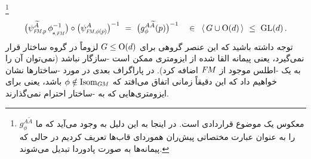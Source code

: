 \footnote{
    معکوس یک موضوع قراردادی است.
    در اینجا به این دلیل به وجود می‌آید که ما $g_\phi^{A\widetilde{A}}$ را به عنوان عبارت مختصاتی پیش‌ران هموردای قاب‌ها تعریف کردیم در حالی که پیمانه‌ها به صورت پادوردا تبدیل می‌شوند.
}
\begin{align}\label{eq:gauge_trafo_pushforward_gauge}
    \big( \psiFMp^{\widetilde{A}} \, \dphiFM^{-1} \big) \circ \big( \psiFMphip^A \big)^{-1}
    \ =\ \big( g_\phi^{A\widetilde{A}}(p) \big)^{-1}
    \ \ \ \in\,\ \langle\, G\cup\O{d} \,\rangle\ \leq\ \GL{d} \,.
\end{align}
توجه داشته باشید که این عنصر گروهی برای $G\leq\operatorname{O}(d)$ لزوماً در گروه ساختار قرار نمی‌گیرد، یعنی پیمانه القا شده از ایزومتری ممکن است -سازگار نباشد (نمی‌توان آن را به یک -اطلس موجود از $F\mkern-1.5muM$ اضافه کرد).
در پاراگراف بعدی در مورد -ساختارها نشان خواهیم داد که این دقیقاً زمانی اتفاق می‌افتد که $\phi \notin \operatorname{Isom}_{G\mkern-1.4muM}$ باشد، یعنی برای ایزومتری‌هایی که به -ساختار احترام نمی‌گذارند.


